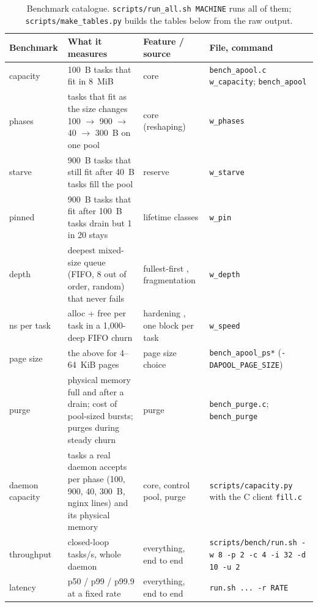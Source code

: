 \documentclass[10.5pt,a4paper]{article}
\newcommand{\file}[1]{\texttt{\small #1}}
\newcommand{\fn}[1]{\texttt{\small #1}}
\begin{document}
\begin{table}[ht]
\centering\footnotesize
\begin{tabularx}{\textwidth}{@{}L{2.4cm}YL{3cm}L{3.2cm}@{}}
\toprule
Benchmark & What it measures & Feature / source & File, command \\
\midrule
capacity & 100~B tasks that fit in 8~MiB & core \citep{bonwick1994slab,leijen2019mimalloc} & \file{bench\_apool.c} \fn{w\_capacity}; \texttt{bench\_apool} \\
phases & tasks that fit as the size changes 100 $\to$ 900 $\to$ 40 $\to$ 300~B on one pool & core (reshaping) & \fn{w\_phases} \\
starve & 900~B tasks that still fit after 40~B tasks fill the pool & reserve \citep{gorman2004vmm} & \fn{w\_starve} \\
pinned & 900~B tasks that fit after 100~B tasks drain but 1 in 20 stays & lifetime classes \citep{maas2020llama} & \fn{w\_pin} \\
depth & deepest mixed-size queue (FIFO, 8 out of order, random) that never fails & fullest-first \citep{berger2000hoard}, fragmentation & \fn{w\_depth} \\
ns per task & alloc + free per task in a 1,000-deep FIFO churn & hardening \citep{leijen2019mimalloc}, one block per task & \fn{w\_speed} \\
page size & the above for 4--64~KiB pages & page size choice & \texttt{bench\_apool\_ps*} (\texttt{-DAPOOL\_PAGE\_SIZE}) \\
purge & physical memory full and after a drain; cost of pool-sized bursts; purges during steady churn & purge \citep{evans2006jemalloc,leijen2019mimalloc} & \file{bench\_purge.c}; \texttt{bench\_purge} \\
daemon capacity & tasks a real daemon accepts per phase (100, 900, 40, 300~B, nginx lines) and its physical memory & core, control pool, purge & \file{scripts/capacity.py} with the C client \file{fill.c} \\
throughput & closed-loop tasks/s, whole daemon & everything, end to end & \file{scripts/bench/run.sh -w 8 -p 2 -c 4 -i 32 -d 10 -u 2} \\
latency & p50 / p99 / p99.9 at a fixed rate & everything, end to end & \file{run.sh ... -r RATE} \\
\bottomrule
\end{tabularx}
\caption{Benchmark catalogue. \file{scripts/run\_all.sh MACHINE} runs all of them; \file{scripts/make\_tables.py} builds the tables below from the raw output.}
\label{tab:catalogue}
\end{table}
\end{document}
